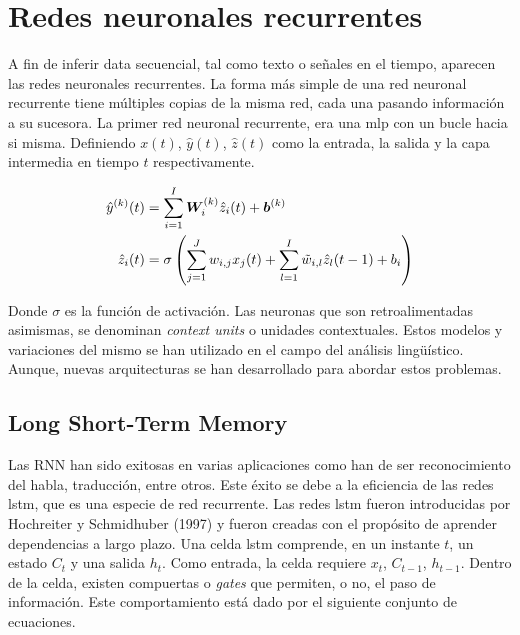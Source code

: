\section{Redes neuronales recurrentes}

\indent A fin de inferir data secuencial, tal como texto o señales en el tiempo, aparecen las redes neuronales recurrentes. La forma más simple de una red neuronal recurrente tiene múltiples copias de la misma red, cada una pasando información a su sucesora. La primer red neuronal recurrente, era una \acrshort{mlp} con un bucle hacia si misma. Definiendo $x(t)$, $\hat{y}(t)$, $\hat{z}(t)$ como la entrada, la salida y la capa intermedia en tiempo $t$ respectivamente. 

\begin{align*}
    \hat{y}^{(k)}(t) &= \sum_{i=1}^{I} \bm{W}_i^{(k)} \hat{z}_i(t) + \bm{b}^{(k)} \\
    \hat{z}_i(t) &= \sigma\left(\sum_{j=1}^J w_{i,j}x_j(t) + \sum_{l=1}^I \Tilde{w}_{i,l} \hat{z}_l(t-1) + b_i \right)
\end{align*}

\indent Donde $\sigma$ es la función de activación. Las neuronas que son retroalimentadas asimismas, se denominan \textit{context units} o unidades contextuales. Estos modelos y variaciones del mismo se han utilizado en el campo del análisis lingüístico. Aunque, nuevas arquitecturas se han desarrollado para abordar estos problemas.

\subsection*{Long Short-Term Memory}

\indent Las RNN han sido exitosas en varias aplicaciones como han de ser reconocimiento del habla, traducción, entre otros. Este éxito se debe a la eficiencia de las redes \acrshort{lstm}, que es una especie de red recurrente. Las redes \acrshort{lstm} fueron introducidas por Hochreiter y Schmidhuber (1997) \cite{pp:hochreiter-schmidhuber} y fueron creadas con el propósito de aprender dependencias a largo plazo. Una celda \acrshort{lstm} comprende, en un instante $t$, un estado $C_t$ y una salida $h_t$. Como entrada, la celda requiere $x_t$, $C_{t-1}$, $h_{t-1}$. Dentro de la celda, existen compuertas o \textit{gates} que permiten, o no, el paso de información. Este comportamiento está dado por el siguiente conjunto de ecuaciones.

